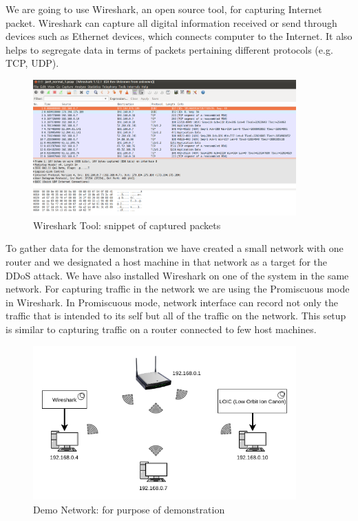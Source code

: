 \documentclass[10pt,oneside,a4paper]{article}
\begin{document}
We are going to use Wireshark, an open source tool, for capturing Internet packet. Wireshark can capture all digital information received or send through devices such as Ethernet devices, which connects computer to the Internet. It also helps to segregate data in terms of packets pertaining different protocols (e.g. TCP, UDP).\par

\begin{figure}[H]
\centering
\includegraphics[width=0.90\textwidth]{Wireshark_Tools.png}
\caption{Wireshark Tool: snippet of captured packets} \label{fig:wireshark}
\end{figure}

To gather data for the demonstration we have created a small network with one router and we designated a host machine in that network as a target for the DDoS attack. We have also installed Wireshark on one of the system in the same network. For capturing traffic in the network we are using the Promiscuous mode in Wireshark. In Promiscuous mode, network interface can record not only the traffic that is intended to its self but all of the traffic on the network. This setup is similar to capturing traffic on a router connected to few host machines.

\begin{figure}[H]
\centering
\includegraphics[width=0.90\textwidth]{demo_network}
\caption{Demo Network: for purpose of demonstration} \label{fig:demonetwork}
\end{figure}
\end{document}
